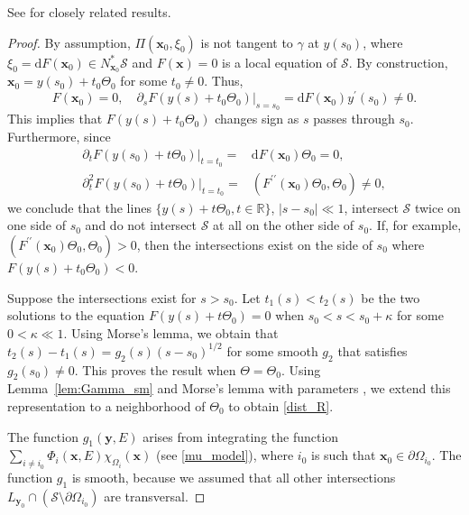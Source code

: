 \documentclass[11pt]{article}
\newcommand{\be}{\begin{equation}}
\newcommand{\ee}{\end{equation}}
\newcommand{\bs}{\begin{split}}
\newcommand{\s}{\mathcal S}
\newcommand{\br}{\mathbb{R}}
\newcommand{\pa}{\partial}
\newcommand{\dd}{\mathrm{d}}
\newcommand{\ga}{\gamma}
\numberwithin{equation}{section}
\newcommand{\vy}{\mathbf{y}}
\newcommand{\vx}{\mathbf{x}}
\theoremstyle{definition}
\begin{document}
See \cite{rz1, rz5, airapramm01} for closely related results.

\begin{proof} By assumption, $\Pi(\vx_0,\xi_0)$ is not tangent to $\ga$ at $y(s_0)$, where $\xi_0=\dd F(\vx_0)\in N_{\vx_0}^*\s$ and $F(\vx)=0$ is a local equation of $\s$. By construction, $\vx_0=y(s_0)+t_0\Theta_0$ for some $t_0\not=0$. Thus,
\be
F(\vx_0)=0,\quad \pa_s F(y(s)+t_0\Theta_0)|_{s=s_0}=\dd F(\vx_0)y^\prime(s_0)\not=0. 
\ee
This implies that $F(y(s)+t_0\Theta_0)$ changes sign as $s$ passes through $s_0$. Furthermore, since
\be\bs
\pa_t F(y(s_0)+t\Theta_0)|_{t=t_0}=&\dd F(\vx_0)\Theta_0=0,\\ 
\pa_t^2 F(y(s_0)+t\Theta_0)|_{t=t_0}=&(F^{\prime\prime}(\vx_0)\Theta_0,\Theta_0)\not=0, 
\end{split}
\ee
we conclude that the lines $\{y(s)+t\Theta_0,t\in\br\}$, $|s-s_0|\ll1$, intersect $\s$ twice on one side of $s_0$ and do not intersect $\s$ at all on the other side of $s_0$. If, for example, $(F^{\prime\prime}(\vx_0)\Theta_0,\Theta_0)>0$, then the intersections exist on the side of $s_0$ where $F(y(s)+t_0\Theta_0)<0$.

Suppose the intersections exist for $s>s_0$. Let $t_1(s)<t_2(s)$ be the two solutions to the equation $F(y(s)+t\Theta_0)=0$ when $s_0<s<s_0+\kappa$ for some $0<\kappa\ll1$. Using Morse's lemma, we obtain that $t_2(s)-t_1(s)=g_2(s)(s-s_0)^{1/2}$ for some smooth $g_2$ that satisfies $g_2(s_0)\not=0$. This proves the result when $\Theta=\Theta_0$. Using Lemma~\ref{lem:Gamma_sm} and Morse's lemma with parameters \cite[Lemma C.6.1]{hor3}, we extend this representation to a neighborhood of $\Theta_0$ to obtain \eqref{dist_R}.

The function $g_1(\vy,E)$ arises from integrating the function $\sum_{i \not= i_0} \Phi_i(\vx,E) \chi_{\Omega_i}(\vx)$ (see \eqref{mu_model}), where $i_0$ is such that $\vx_0\in\pa\Omega_{i_0}$. The function $g_1$ is smooth, because we assumed that all other intersections $L_{\vy_0}\cap(\s\setminus \pa\Omega_{i_0})$ are transversal.
\end{proof}
\end{document}
